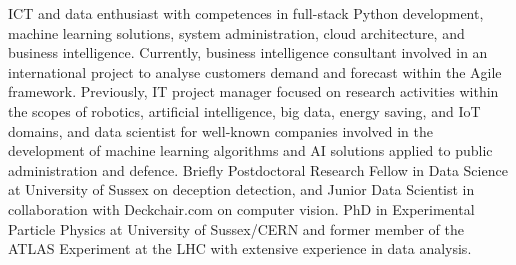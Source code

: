 
ICT and data enthusiast with competences in full-stack Python development, machine learning solutions, system administration, cloud architecture, and business intelligence. Currently, business intelligence consultant involved in an international project to analyse customers demand and forecast within the Agile framework. Previously, IT project manager focused on research activities within the scopes of robotics, artificial intelligence, big data, energy saving, and IoT domains, and data scientist for well-known companies involved in the development of machine learning algorithms and AI solutions applied to public administration and defence. Briefly Postdoctoral Research Fellow in Data Science at University of Sussex on deception detection, and Junior Data Scientist in collaboration with Deckchair.com on computer vision. PhD in Experimental Particle Physics at University of Sussex/CERN and former member of the ATLAS Experiment at the LHC with extensive experience in data analysis.